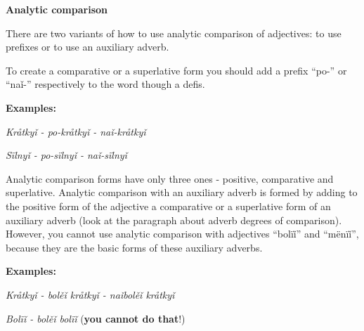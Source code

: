 \textbf{Analytic comparison}

There are two variants of how to use analytic comparison of adjectives: to use prefixes or to use an auxiliary adverb.

To create a comparative or a superlative form you should add a prefix “po-” or “naǐ-” respectively to the word though a defis.

\textbf{Examples:}

\textit{Kråtkyǐ - po-kråtkyǐ - naǐ-kråtkyǐ}

\textit{Sïlnyǐ - po-sïlnyǐ - naǐ-sïlnyǐ}

Analytic comparison forms have only three ones - positive, comparative and superlative. Analytic comparison with an auxiliary adverb is formed by adding to the positive form of the adjective a comparative or a superlative form of an auxiliary adverb (look at the paragraph about adverb degrees of comparison). However, you cannot use analytic comparison with adjectives “bolïǐ” and “mënïǐ”, because they are the basic forms of these auxiliary adverbs.

\textbf{Examples:}

\textit{Kråtkyǐ - bolěǐ kråtkyǐ - naǐbolěǐ kråtkyǐ}

\textit{Bolïǐ - bolěǐ bolïǐ} (\textbf{you cannot do that}!)
